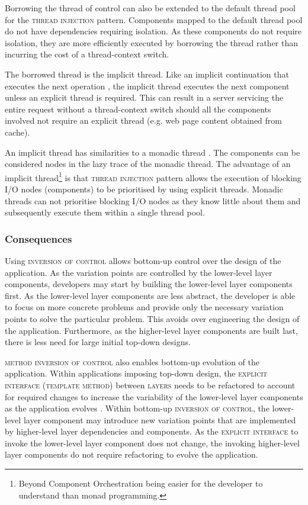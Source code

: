\documentclass[prodmode]{style/acmlarge}
\begin{document}
Borrowing the thread of control can also be extended to the default thread pool
for the \textsc{thread injection} pattern.  Components mapped to the default
thread pool do not have dependencies requiring isolation.  As these components
do not require isolation, they are more efficiently executed by borrowing the
thread rather than incurring the cost of a thread-context switch.

The borrowed thread is the implicit thread.  Like an implicit continuation that
executes the next operation \cite{continuations}, the implicit thread executes
the next component unless an explicit thread is required.  This can result in
a server servicing the entire request without a thread-context switch
should all the components involved not require an explicit thread
(e.g. web page content obtained from cache).

An implicit thread has similarities to a monadic thread \cite{monadic-thread}.
The components can be considered nodes in the lazy trace of the monadic thread.
The advantage of an implicit thread\footnote{Beyond Component Orchestration
being easier for the developer to understand than monad programming.} is that
\textsc{thread injection} pattern allows the execution of blocking I/O nodes
(components) to be prioritised by using explicit threads.  Monadic threads can
not prioritise blocking I/O nodes as they know little about them and
subsequently execute them within a single thread pool.


\subsubsection*{Consequences}

Using \textsc{inversion of control} allows bottom-up control over the design of
the application.  As the variation points are controlled by the lower-level
layer components, developers may start by building the lower-level layer
components first.  As the lower-level layer components are less abstract, the
developer is able to focus on more concrete problems and provide only the
necessary variation points to solve the particular problem.  This avoids over
engineering the design of the application.  Furthermore, as the higher-level
layer components are built last, there is less need for large initial top-down
designs.

\textsc{method inversion of control} also enables bottom-up evolution of the
application.  Within applications imposing top-down design, the
\textsc{explicit interface} (\textsc{template method}) between \textsc{layers}
needs to be refactored to account for required changes to increase the
variability of the lower-level layer components as the application evolves
\cite{ioc}.  Within bottom-up \textsc{inversion of control}, the lower-level
layer component may introduce new variation points that are implemented by
higher-level layer dependencies and components.  As the \textsc{explicit
interface} to invoke the lower-level layer component does not change, the
invoking higher-level layer components do not require refactoring to evolve the
application.
\end{document}

